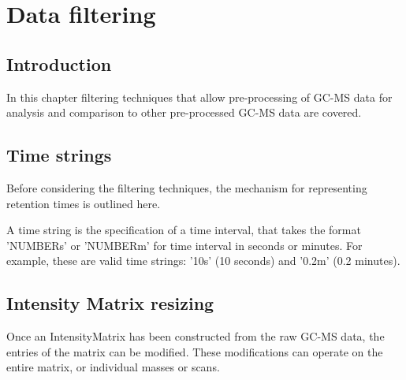 

\chapter{Data filtering}

\section{Introduction}
In this chapter filtering techniques that allow pre-processing of
GC-MS data for analysis and comparison to other pre-processed GC-MS data are
covered.

\section{Time strings}
\label{sec:time-string}

Before considering the filtering techniques, the mechanism for representing
retention times is outlined here.

A time string is the specification of a time interval, that takes the format
'NUMBERs' or 'NUMBERm' for time interval in seconds or minutes. For
example, these are valid time strings: '10s' (10 seconds) and '0.2m'
(0.2 minutes).

\section{Intensity Matrix resizing}

Once an IntensityMatrix has been constructed from the raw GC-MS data, the
entries of the matrix can be modified. These modifications can operate on the
entire matrix, or individual masses or scans.

